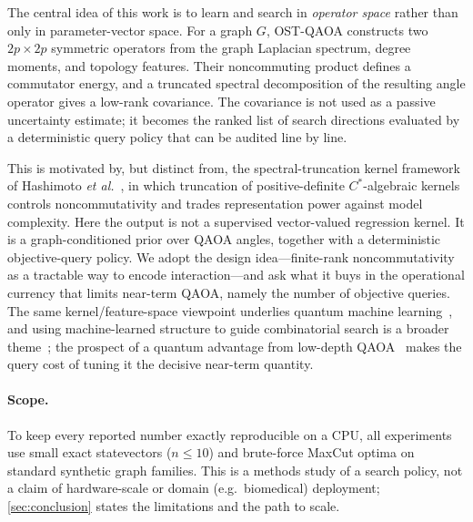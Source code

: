 \documentclass[aps,prresearch,reprint,amsmath,amssymb,floatfix,nofootinbib,superscriptaddress,longbibliography]{revtex4-2}
\theoremstyle{remark}
\newcommand{\QAOA}{\textnormal{\textsc{QAOA}}}
\newcommand{\OSTQAOA}{\textnormal{\textsc{OST-QAOA}}}
\begin{document}
The central idea of this work is to learn and search in \emph{operator space}
rather than only in parameter-vector space.  For a graph \(G\), \OSTQAOA{}
constructs two \(2p\times2p\) symmetric operators from the graph Laplacian
spectrum, degree moments, and topology features.  Their noncommuting product
defines a commutator energy, and a truncated spectral decomposition of the
resulting angle operator gives a low-rank covariance.  The covariance is not used
as a passive uncertainty estimate; it becomes the ranked list of search
directions evaluated by a deterministic query policy that can be audited line by
line.

This is motivated by, but distinct from, the spectral-truncation kernel
framework of Hashimoto \emph{et al.}~\cite{hashimoto2024spectral}, in which
truncation of positive-definite \(C^*\)-algebraic kernels controls
noncommutativity and trades representation power against model complexity.  Here
the output is not a supervised vector-valued regression kernel.  It is a
graph-conditioned prior over \QAOA{} angles, together with a deterministic
objective-query policy.  We adopt the design idea---finite-rank noncommutativity
as a tractable way to encode interaction---and ask what it buys in the operational
currency that limits near-term QAOA, namely the number of objective queries.
The same kernel/feature-space viewpoint underlies quantum machine
learning~\cite{schuld2019feature}, and using machine-learned
structure to guide combinatorial search is a broader
theme~\cite{bengio2021}; the prospect of a quantum advantage from low-depth
QAOA~\cite{farhi2016supremacy} makes the query cost of tuning it the decisive
near-term quantity.

\paragraph{Scope.}  To keep every reported number exactly reproducible on a CPU,
all experiments use small exact statevectors (\(n\le10\)) and brute-force MaxCut
optima on standard synthetic graph families.  This is a methods study of a search
policy, not a claim of hardware-scale or domain (e.g.\ biomedical) deployment;
\cref{sec:conclusion} states the limitations and the path to scale.
\end{document}
